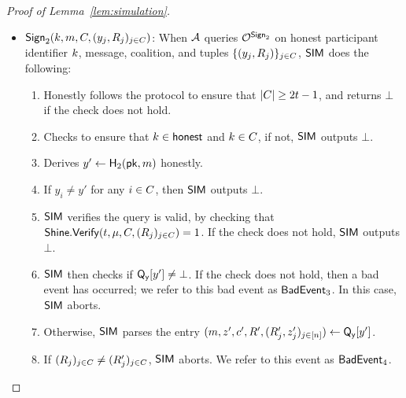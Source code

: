 \begin{proof}[Proof of Lemma~\ref{lem:simulation}]
\begin{itemize}
\begin{enumerate}
        where $L_i(x)$ is the $i\supth$ Lagrange polynomial defined by $\corrupt \cup \{0\}$.
        \item $\SIM$ then derives each honest party's response $z_j, j \in \honest$ via
          Equation~\ref{eq:derive-hon-resp}:

          \begin{equation} \label{eq:derive-hon-resp}
            z_j \gets z \cdot L_0(j) + \sum_{i \in \corrupt} z_i \cdot L_i(j)
          \end{equation}

        \item $\SIM$ sets $\QFour[y] = (\msg, z, c, R, (R_j, z_j)_{j \in \set{n}})$.
        \item $\SIM$ then checks if $\QTwo[(R, \pkgroup, m)] = \bot$;
          if the check does not hold,
          then a bad event has occurred.
          We refer to this bad event as $\BadEventTwo$.
          In this case, $\SIM$ aborts.
          Otherwise, $\SIM$ programs $\QTwo[(R, \pkgroup, m)] = c$.
        \item $\SIM$ then outputs $(y, R_\partyid)$.
      \end{enumerate}

      \medskip

    \item \underline{$\mathsf{Sign}_2(k, m, C, ( y_j, R_j )_{j \in C})$}:
      When $\mathcal{A}$ queries $\mathcal{O}^{\mathsf{Sign}_2}$ on honest participant identifier $k$, message, coalition, and tuples $\{ (y_j, R_j) \}_{j \in C}$,
      $\SIM$ does the following:
      \begin{enumerate}
      \item Honestly follows the protocol to ensure that $\lvert C \rvert \ge 2t-1$,
          and returns $\bot$ if the check does not hold.
      \item Checks to ensure that $k \in \mathsf{honest}$ and $k \in C$,
        if not, $\SIM$ outputs $\bot$.
      \item Derives $y' \gets \mathsf{H}_2(\mathsf{pk}, m)$ honestly.
      \item If $y_i \neq y'$  for any $i \in C$, then $\SIM$ outputs $\bot$.
      \item $\SIM$ verifies the query is valid,
        by checking that $\mathsf{Shine}.\mathsf{Verify}(t, \mu, C, (R_j)_{j \in C}) = 1$.
        If the check does not hold, $\SIM$ outputs $\bot$.
      \item $\SIM$ then checks if $\mathsf{Q_y}[y'] \neq \bot$.
        If the check does not hold,
        then a bad event has occurred;
        we refer to this bad event as $\mathsf{BadEvent}_3$.
        In this case,
        $\SIM$ aborts.
      \item Otherwise, $\SIM$ parses the entry
        $(m, z', c', R', (R_j', z_j')_{j \in [n]}) \gets  \mathsf{Q_y}[y']$.
      \item If $(R_j)_{j \in C} \neq (R_j')_{j \in C}$,
        $\SIM$ aborts.
        We refer to this event as $\mathsf{BadEvent}_4$.


\end{enumerate}
\end{itemize}
\end{proof}
